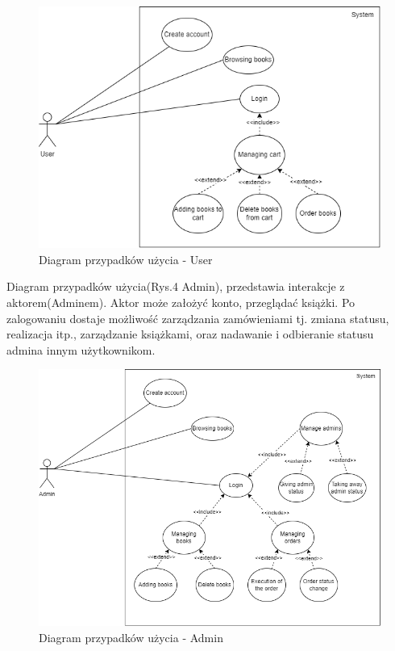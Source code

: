 \documentclass[]{article}
\begin{document}
\begin{figure}[h]
	\centering
	\includegraphics[scale=0.50]{przypadki_uzycia.png}
	\caption{Diagram przypadków użycia - User}
\end{figure}

Diagram przypadków użycia(Rys.4 Admin), przedstawia interakcje z aktorem(Adminem). Aktor może założyć konto, przeglądać książki. Po zalogowaniu dostaje możliwość zarządzania zamówieniami tj. zmiana statusu, realizacja itp., zarządzanie książkami, oraz nadawanie i odbieranie statusu admina innym użytkownikom.

\begin{figure}[ht]
	\centering
	\includegraphics[scale=0.50]{przyp_uz_admin.png}
	\caption{Diagram przypadków użycia - Admin}
\end{figure}
\end{document}
